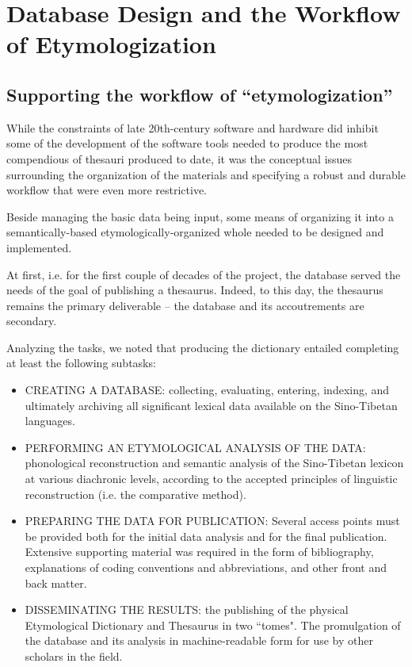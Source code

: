 \section{Database Design and the Workflow of Etymologization}

\subsection{Supporting the workflow of ``etymologization''}
While the constraints of late 20th-century software and hardware did inhibit some of
the development of the software tools needed to produce the most
compendious of thesauri produced to date, it was the conceptual issues
surrounding the organization of the materials and specifying a robust
and durable workflow that were even more restrictive.  

Beside managing the basic data being input, some means of organizing
it into a semantically-based etymologically-organized whole needed to
be designed and implemented. 

At first, i.e. for the first couple of decades of the project, the
database served the needs of the goal of publishing a
thesaurus. Indeed, to this day, the thesaurus remains the primary
deliverable -- the database and its accoutrements are secondary.

Analyzing the tasks, we noted that producing the dictionary entailed completing at least the following
subtasks:
\begin{itemize}
\item  CREATING A DATABASE:  collecting, evaluating, entering, indexing, and ultimately archiving all significant lexical data available on the Sino-Tibetan languages.
\item  PERFORMING AN ETYMOLOGICAL ANALYSIS OF THE DATA: phonological reconstruction and semantic analysis of the Sino-Tibetan lexicon at various diachronic levels, according to the accepted principles of linguistic reconstruction (i.e. the comparative method).
\item  PREPARING THE DATA FOR PUBLICATION: Several access points must be provided both for the initial data analysis and for the final publication.  Extensive supporting material was required in the form of bibliography, explanations of coding conventions and abbreviations, and other front and back matter.
\item  DISSEMINATING THE RESULTS: the publishing of the physical Etymological Dictionary and
  Thesaurus in two ``tomes".  The promulgation of the database and its
  analysis in machine-readable form for use by other
  scholars in the field.
\end{itemize}


